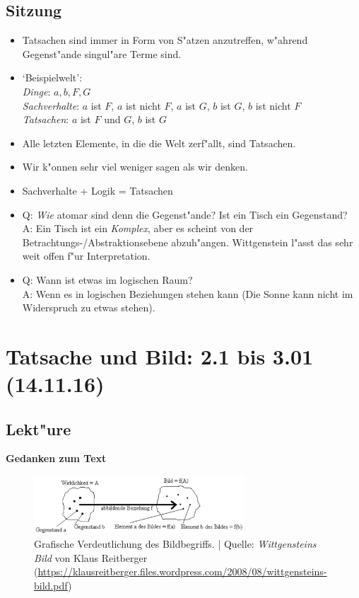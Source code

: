 \documentclass[emulatestandardclasses]{scrartcl}
\begin{document}
\subsection{Sitzung}

\begin{itemize}
  \item Tatsachen sind immer in Form von S"atzen anzutreffen, w"ahrend Gegenst"ande singul"are Terme sind. 
  \item `Beispielwelt':\\\emph{Dinge}: $a, b, F, G$\\\emph{Sachverhalte}: $a$ ist $F$, $a$ ist nicht $F$,  $a$ ist $G$, $b$ ist $G$, $b$ ist nicht $F$\\\emph{Tatsachen}:  $a$ ist $F$ und $G$, $b$ ist $G$
  \item Alle letzten Elemente, in die die Welt zerf"allt, sind Tatsachen.
  \item Wir k"onnen sehr viel weniger sagen als wir denken.
  \item Sachverhalte + Logik = Tatsachen
  \item Q: \emph{Wie} atomar sind denn die Gegenst"ande? Ist ein Tisch ein Gegenstand?\\A: Ein Tisch ist ein \emph{Komplex}, aber es scheint von der Betrachtungs-/Abstraktionsebene abzuh"angen. Wittgenstein l"asst das sehr weit offen f"ur Interpretation.
  \item Q: Wann ist etwas im logischen Raum?\\A: Wenn es in logischen Beziehungen stehen kann (Die Sonne kann nicht im Widerspruch zu etwas stehen).
\end{itemize}

\section{Tatsache und Bild: 2.1 bis 3.01\\(14.11.16)}


\subsection{Lekt"ure}
\textbf{Gedanken zum Text}

\begin{figure}[h]
	\centering
	\includegraphics[width=0.7\textwidth]{images/tractatus/bild}
	\caption{Grafische Verdeutlichung des Bildbegriffs. | Quelle: \emph{Wittgensteins Bild}
von Klaus Reitberger (\url{https://klausreitberger.files.wordpress.com/2008/08/wittgensteins-bild.pdf})}
	\label{fig:bild}
\end{figure}
\end{document}
